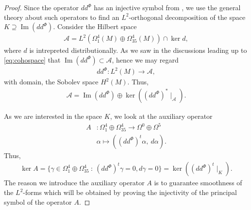 \documentclass[10pt,a4paper,reqno]{article}
\theoremstyle{definition}
\numberwithin{equation}{section}
\def\ddphi{dd^{\Phi}}
\def\cA{\mathcal{A}}
\DeclareMathOperator{\Ima}{Im}
\begin{document}
\begin{proof}
Since the operator $\ddphi$ has an injective symbol from , we use the general theory about such operators to find an $L^2$-orthogonal decomposition of the space $K\supseteq \Ima(\ddphi)$. Consider the Hilbert space
\begin{align*}
\cA = L^2(\Omega^4_1(M)\oplus \Omega^4_{35}(M)) \cap \ker d,
\end{align*}
where $d$ is intrepreted distributionally. As we saw in the discussions leading up to \cref{eq:cohospace} that $\Ima(\ddphi)\subset \cA$, hence we may regard
\begin{align*}
\ddphi: L^2(M) \rightarrow \cA,
\end{align*}
with domain, the Sobolev space $H^2(M)$. Thus,
\begin{align}\label{eq:hilbertspaceimage}
\cA = \Ima(\ddphi) \oplus \ker \left((dd^{\Phi})^*\mid_{\cA}\right).
\end{align}

As we are interested in the space $K$, we look at the auxiliary operator 
\begin{align*}
A&: \Omega^4_1\oplus \Omega^4_{35} \rightarrow \Omega^0 \oplus \Omega^5\\
& \alpha \mapsto \left((\ddphi)^t\alpha,\ d\alpha \right).
\end{align*}
Thus, 
\begin{align*}
\ker A =\{ \gamma \in \Omega^4_1\oplus \Omega^4_{35}\ :\ (\ddphi)^t\gamma=0, d\gamma=0\} = \ker\left( (\ddphi)^t\mid_K \right).    \end{align*}
The reason we introduce the auxiliary operator $A$ is to  guarantee smoothness of the $L^2$-forms which will be obtained by proving the injectivity of the principal symbol of the operator $A$.


\end{proof}
\end{document}
